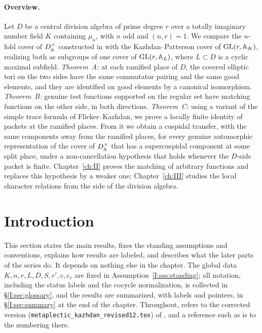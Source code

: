 \paragraph{Overview.} Let $D$ be a central division algebra of prime degree $r$ over a totally imaginary number field $K$ containing $\mu_n$, with $n$ odd and $(n,r)=1$. We compare the $n$-fold cover of $D^\times_{\mathbb{A}}$ constructed in \cite{JC26a} with the Kazhdan--Patterson cover of $\mathrm{GL}(r,\mathbb{A}_K)$, realizing both as subgroups of one cover of $\mathrm{GL}(r,\mathbb{A}_L)$, where $L\subset D$ is a cyclic maximal subfield. \emph{Theorem~A:} at each ramified place of $D$, the covered elliptic tori on the two sides have the same commutator pairing and the same good elements, and they are identified on good elements by a canonical isomorphism. \emph{Theorem~B:} genuine test functions supported on the regular set have matching functions on the other side, in both directions. \emph{Theorem~C:} using a variant of the simple trace formula of Flicker--Kazhdan, we prove a locally finite identity of packets at the ramified places. From it we obtain a cuspidal transfer, with the same components away from the ramified places, for every genuine automorphic representation of the cover of $D^\times_{\mathbb{A}}$ that has a supercuspidal component at some split place, under a non-cancellation hypothesis that holds whenever the $D$-side packet is finite. Chapter~\ref{ch:II} proves the matching of arbitrary functions and replaces this hypothesis by a weaker one; Chapter~\ref{ch:III} studies the local character relations from the side of the division algebra.

\section{Introduction}\label{I:sec:intro}
This section states the main results, fixes the standing assumptions and conventions, explains how results are labeled, and describes what the later parts of the series do. It depends on nothing else in the chapter. The global data $K,n,r,L,D,S,r',c,c_v$ are fixed in Assumption~\ref{I:ass:standing}; all notation, including the status labels and the cocycle normalization, is collected in \S\ref{I:sec:glossary}, and the results are summarized, with labels and pointers, in \S\ref{I:sec:summary} at the end of the chapter. Throughout, \cite{JC26a} refers to the corrected version (\texttt{metaplectic\_kazhdan\_revised12.tex}) of \cite{Jo88}, and a reference such as \cite[Lemma~6.1]{JC26a} is to the numbering there.

